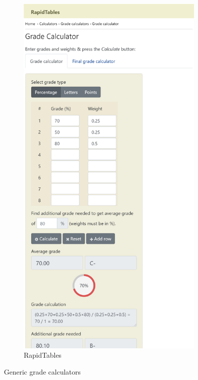 \begin{figure}[ht!]
\begin{subfigure}{0.3\textwidth}
    \label{grade-calculator-ben}
\end{subfigure}\hfil
\begin{subfigure}{0.3\textwidth}
  \includegraphics[frame,width=\linewidth]{media/grade-calculator-rapid.png}
\caption[RapidTables]{RapidTables \cite{grade-calculator-rapid}}
\label{grade-calculator-rapid}
\end{subfigure}
\caption{Generic grade calculators}
\label{fig:images}
\end{figure}

